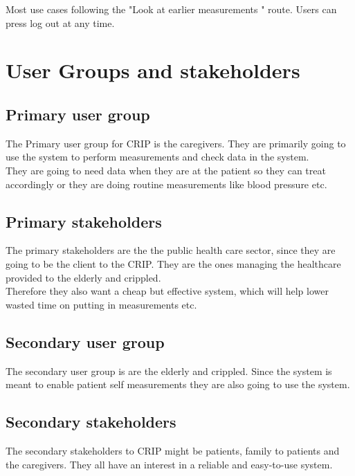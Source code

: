 Most use cases following the "Look at earlier measurements " route. Users can press log out at any time. 


\section{User Groups and stakeholders}
\subsection{Primary user group}
The Primary user group for CRIP is the caregivers. They are primarily going to use the system to perform measurements and check data in the system.\\
They are going to need data when they are at the patient so they can treat accordingly or they are doing routine measurements like blood pressure etc.\\


\subsection{Primary stakeholders}
The primary stakeholders are the the public health care sector, since they are going to be the client to the CRIP. They are the ones managing the healthcare provided to the elderly and crippled.\\
Therefore they also want a cheap but effective system, which will help lower wasted time on putting in measurements etc.\\

\subsection{Secondary user group}
The secondary user group is are the elderly and crippled. Since the system is meant to enable patient self measurements they are also going to use the system.\\


\subsection{Secondary stakeholders}
The secondary stakeholders to CRIP might be patients, family to patients and the caregivers. They all have an interest in a reliable and easy-to-use system.\\

